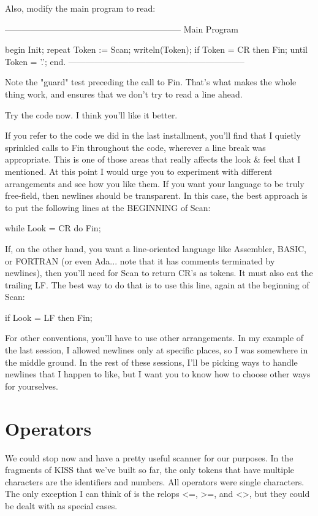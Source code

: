 \documentclass[float=false, crop=false]{standalone}
\begin{document}
Also, modify the main program to read:

\begin{code}
{--------------------------------------------------------------}
{ Main Program }


begin
   Init;
   repeat
      Token := Scan;
      writeln(Token);
      if Token = CR then Fin;
   until Token = '.';
end.
{--------------------------------------------------------------}
\end{code}

Note the "guard" test preceding the call to Fin. That's what makes the whole
thing work, and ensures that we don't try to read a line ahead.

Try the code now. I think you'll like it better.

If you refer to the code we did in the last installment, you'll find that I
quietly sprinkled calls to Fin throughout the code, wherever a line break was
appropriate. This is one of those areas that really affects the look & feel that
I mentioned. At this point I would urge you to experiment with different
arrangements and see how you like them. If you want your language to be truly
free-field, then newlines should be transparent. In this case, the best approach
is to put the following lines at the BEGINNING of Scan:


          while Look = CR do
             Fin;


If, on the other hand, you want a line-oriented language like Assembler, BASIC,
or FORTRAN (or even Ada... note that it has comments terminated by newlines),
then you'll need for Scan to return CR's as tokens. It must also eat the
trailing LF. The best way to do that is to use this line, again at the beginning
of Scan:

          if Look = LF then Fin;


For other conventions, you'll have to use other arrangements. In my example of
the last session, I allowed newlines only at specific places, so I was somewhere
in the middle ground. In the rest of these sessions, I'll be picking ways to
handle newlines that I happen to like, but I want you to know how to choose
other ways for yourselves.


\section{Operators}

We could stop now and have a pretty useful scanner for our purposes. In the
fragments of KISS that we've built so far, the only tokens that have multiple
characters are the identifiers and numbers. All operators were single
characters. The only exception I can think of is the relops <=, >=, and <>, but
they could be dealt with as special cases.
\end{document}
